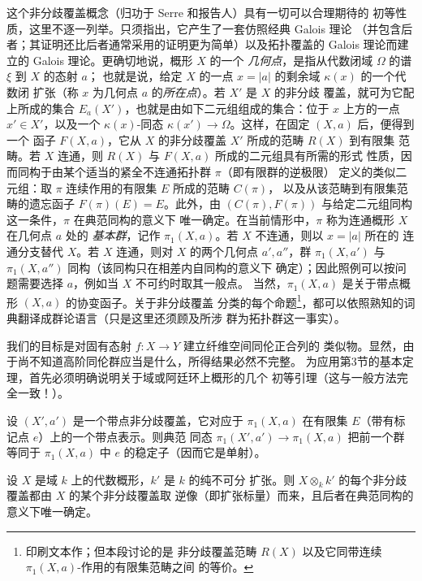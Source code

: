 这个非分歧覆盖概念（归功于 Serre 和报告人）具有一切可以合理期待的
初等性质，这里不逐一列举。只须指出，它产生了一套仿照经典 Galois 理论
（并包含后者；其证明还比后者通常采用的证明更为简单）以及拓扑覆盖的
Galois 理论而建立的 Galois 理论。更确切地说，概形 $X$ 的一个
\emph{几何点}，是指从代数闭域 $\Omega$ 的谱 $\xi$ 到 $X$ 的态射 $a$；
也就是说，给定 $X$ 的一点 $x=|a|$ 的剩余域 $\kappa(x)$ 的一个代数闭
扩张（称 $x$ 为几何点 $a$ 的\emph{所在点}）。若 $X'$ 是 $X$ 的非分歧
覆盖，就可为它配上所成的集合
$E_a(X')$，也就是由如下二元组组成的集合：位于 $x$ 上方的一点
$x'\in X'$，以及一个 $\kappa(x)$-同态
$\kappa(x')\longrightarrow\Omega$。这样，在固定 $(X,a)$ 后，便得到一个
函子 $F(X,a)$，它从 $X$ 的非分歧覆盖 $X'$ 所成的范畴 $R(X)$ 到有限集
范畴。若 $X$ 连通，则 $R(X)$ 与 $F(X,a)$ 所成的二元组具有所需的形式
性质，因而同构于由某个适当的紧全不连通拓扑群 $\pi$（即有限群的逆极限）
定义的类似二元组：取 $\pi$ 连续作用的有限集 $E$ 所成的范畴 $C(\pi)$，
以及从该范畴到有限集范畴的遗忘函子 $F(\pi)(E)=E$。此外，由
$(C(\pi),F(\pi))$ 与给定二元组同构这一条件，$\pi$ 在典范同构的意义下
唯一确定。在当前情形中，$\pi$ 称为连通概形 $X$ 在几何点 $a$ 处的
\emph{基本群}，记作 $\pi_1(X,a)$。若 $X$ 不连通，则以 $x=|a|$ 所在的
连通分支替代 $X$。若 $X$ 连通，则对 $X$ 的两个几何点 $a',a''$，群
$\pi_1(X,a')$ 与 $\pi_1(X,a'')$ 同构（该同构只在相差内自同构的意义下
确定）；因此照例可以按问题需要选择 $a$，例如当 $X$ 不可约时取其一般点。
当然，$\pi_1(X,a)$ 是关于带点概形 $(X,a)$ 的协变函子。关于非分歧覆盖
分类的每个命题\footnote{印刷文本作；但本段讨论的是
非分歧覆盖范畴 $R(X)$ 以及它同带连续 $\pi_1(X,a)$-作用的有限集范畴之间
的等价。}，都可以依照熟知的词典翻译成群论语言（只是这里还须顾及所涉
群为拓扑群这一事实）。

我们的目标是对固有态射 $f:X\longrightarrow Y$ 建立纤维空间同伦正合列的
类似物。显然，由于尚不知道高阶同伦群应当是什么，所得结果必然不完整。
为应用第3节的基本定理，首先必须明确说明关于域或阿廷环上概形的几个
初等引理（这与一般方法完全一致！）。

 设 $(X',a')$ 是一个带点非分歧覆盖，它对应于
$\pi_1(X,a)$ 在有限集 $E$（带有标记点 $e$）上的一个带点表示。则典范
同态 $\pi_1(X',a')\longrightarrow\pi_1(X,a)$ 把前一个群等同于
$\pi_1(X,a)$ 中 $e$ 的稳定子（因而它是单射）。

 设 $X$ 是域 $k$ 上的代数概形，$k'$ 是 $k$ 的纯不可分
扩张。则 $X\otimes_k k'$ 的每个非分歧覆盖都由 $X$ 的某个非分歧覆盖取
逆像（即扩张标量）而来，且后者在典范同构的意义下唯一确定。

